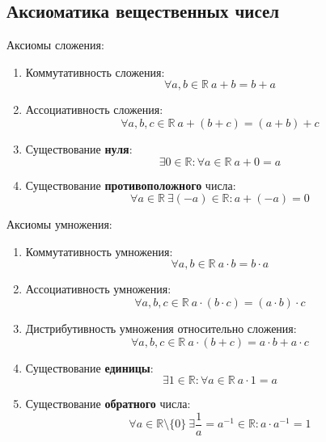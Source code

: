 \subsection{Аксиоматика вещественных чисел}
Аксиомы сложения:
\begin{enumerate}
	\item Коммутативность сложения:
	\begin{equation*}
	\forall a, b \in \mathbb R \
	a + b = b + a
	\end{equation*}
	
	\item Ассоциативность сложения:
	\begin{equation*}
	\forall a, b, c \in \mathbb R \
	a + (b + c) = (a + b) + c
	\end{equation*}
	
	\item Существование \textbf{нуля}:
	\begin{equation*}
	\exists 0 \in \mathbb R \colon
	\forall a \in \mathbb R \
	a + 0 = a
	\end{equation*}
	
	\item Существование \textbf{противоположного} числа:
	\begin{equation*}
	\forall a \in \mathbb R \
	\exists (-a) \in \mathbb R \colon
	a + (-a) = 0
	\end{equation*}
\end{enumerate}

Аксиомы умножения:
\begin{enumerate}
	\item Коммутативность умножения:
	\begin{equation*}
	\forall a, b \in \mathbb R \
	a \cdot b = b \cdot a
	\end{equation*}
	
	\item Ассоциативность умножения:
	\begin{equation*}
	\forall a, b, c \in \mathbb R \
	a \cdot (b \cdot c) = (a \cdot b) \cdot c
	\end{equation*}
	
	\item Дистрибутивность умножения относительно сложения:
	\begin{equation*}
	\forall a, b, c \in \mathbb R \
	a \cdot (b + c) = a \cdot b + a \cdot c
	\end{equation*}
	
	\item Существование \textbf{единицы}:
	\begin{equation*}
	\exists 1 \in \mathbb R \colon
	\forall a \in \mathbb R \
	a \cdot 1 = a
	\end{equation*}
	
	\item Существование \textbf{обратного} числа:
	\begin{equation*}
	\forall a \in \mathbb R \setminus \{ 0 \} \
	\exists \frac1a = a^{-1} \in \mathbb R \colon
	a \cdot a^{-1} = 1
	\end{equation*}
\end{enumerate}

